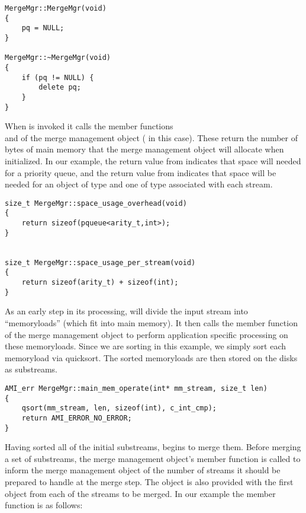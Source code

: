 \begin{verbatim}
MergeMgr::MergeMgr(void)
{
    pq = NULL;
}

MergeMgr::~MergeMgr(void)
{
    if (pq != NULL) {
        delete pq;
    }
}
\end{verbatim}

When  is invoked 
it calls the member functions \\%
 and
 of the merge management
object ( in this case).  These
return the number of bytes of main memory that the merge
management object will allocate when initialized.  In our
example, the return value from
 indicates that space will
needed for a priority queue, and the return value from
 indicates that space
will be needed for an object of type  and one of
type  associated with each stream.

\begin{verbatim}
size_t MergeMgr::space_usage_overhead(void)
{
    return sizeof(pqueue<arity_t,int>);
}


size_t MergeMgr::space_usage_per_stream(void)
{
    return sizeof(arity_t) + sizeof(int);
}
\end{verbatim}

As an early step in its processing,
 will divide the input
stream into ``memoryloads'' (which fit into main
memory). It then calls the member function
 of the merge management object
to perform application specific processing on these memoryloads.
Since we are sorting in this example, we simply sort each memoryload
via quicksort. The sorted memoryloads are then stored on the
disks as substreams.

\begin{verbatim}
AMI_err MergeMgr::main_mem_operate(int* mm_stream, size_t len)
{
    qsort(mm_stream, len, sizeof(int), c_int_cmp);
    return AMI_ERROR_NO_ERROR;
}
\end{verbatim}

Having sorted all of the initial substreams,
 begins to merge them.
Before merging a set of substreams, the merge management
object's member function  is called to
inform the merge management object of the number of streams
it should be prepared to handle at the merge step.  The
object is also provided with the first object from each of
the streams to be merged.  In our example the
 member function is as follows:

